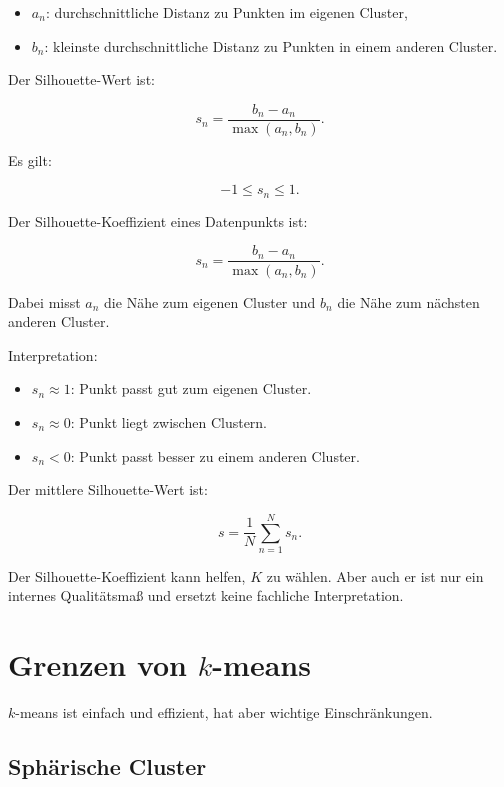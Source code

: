 \begin{itemize}
    \item \(a_n\): durchschnittliche Distanz zu Punkten im eigenen Cluster,
    \item \(b_n\): kleinste durchschnittliche Distanz zu Punkten in einem anderen Cluster.
\end{itemize}

Der Silhouette-Wert ist:

\[
    s_n
    =
    \frac{b_n-a_n}{\max(a_n,b_n)}.
\]

Es gilt:

\[
    -1 \leq s_n \leq 1.
\]

\begin{definitionbox}
Der Silhouette-Koeffizient eines Datenpunkts ist:

\[
    s_n
    =
    \frac{b_n-a_n}{\max(a_n,b_n)}.
\]

Dabei misst \(a_n\) die Nähe zum eigenen Cluster und \(b_n\) die Nähe zum nächsten anderen Cluster.
\end{definitionbox}

Interpretation:

\begin{itemize}
    \item \(s_n\approx 1\): Punkt passt gut zum eigenen Cluster.
    \item \(s_n\approx 0\): Punkt liegt zwischen Clustern.
    \item \(s_n<0\): Punkt passt besser zu einem anderen Cluster.
\end{itemize}

Der mittlere Silhouette-Wert ist:

\[
    s
    =
    \frac{1}{N}
    \sum_{n=1}^{N}
    s_n.
\]

\begin{notebox}
Der Silhouette-Koeffizient kann helfen, \(K\) zu wählen.
Aber auch er ist nur ein internes Qualitätsmaß und ersetzt keine fachliche Interpretation.
\end{notebox}

\section{Grenzen von \(k\)-means}

\(k\)-means ist einfach und effizient, hat aber wichtige Einschränkungen.

\subsection{Sphärische Cluster}

